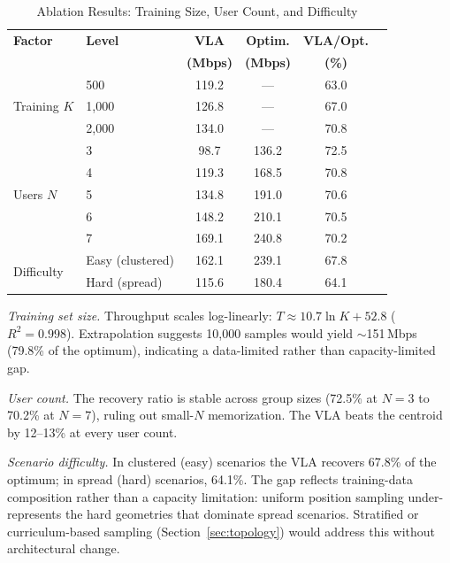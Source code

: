 \documentclass[journal]{IEEEtran}
\begin{document}
\begin{table}[!t]
    \centering
    \caption{Ablation Results: Training Size, User Count, and Difficulty}
    \label{tab:ablation}
    \footnotesize
    \begin{tabular}{@{}llcccc@{}}
        \toprule
        \textbf{Factor} & \textbf{Level} & \textbf{VLA} & \textbf{Optim.} & \textbf{VLA/Opt.} \\
         & & \textbf{(Mbps)} & \textbf{(Mbps)} & \textbf{(\%)} \\
        \midrule
        \multirow{3}{*}{Training $K$} & 500 & 119.2 & --- & 63.0 \\
         & 1{,}000 & 126.8 & --- & 67.0 \\
         & 2{,}000 & 134.0 & --- & 70.8 \\
        \midrule
        \multirow{5}{*}{Users $N$} & 3 & 98.7 & 136.2 & 72.5 \\
         & 4 & 119.3 & 168.5 & 70.8 \\
         & 5 & 134.8 & 191.0 & 70.6 \\
         & 6 & 148.2 & 210.1 & 70.5 \\
         & 7 & 169.1 & 240.8 & 70.2 \\
        \midrule
        \multirow{2}{*}{Difficulty} & Easy (clustered) & 162.1 & 239.1 & 67.8 \\
         & Hard (spread) & 115.6 & 180.4 & 64.1 \\
        \bottomrule
    \end{tabular}
\end{table}

\emph{Training set size.} Throughput scales log-linearly: $T \approx 10.7 \ln K + 52.8$ ($R^2{=}0.998$). Extrapolation suggests 10{,}000 samples would yield ${\sim}$151\,Mbps (79.8\% of the optimum), indicating a data-limited rather than capacity-limited gap.

\emph{User count.} The recovery ratio is stable across group sizes (72.5\% at $N{=}3$ to 70.2\% at $N{=}7$), ruling out small-$N$ memorization. The VLA beats the centroid by 12--13\% at every user count.

\emph{Scenario difficulty.} In clustered (easy) scenarios the VLA recovers 67.8\% of the optimum; in spread (hard) scenarios, 64.1\%. The gap reflects training-data composition rather than a capacity limitation: uniform position sampling under-represents the hard geometries that dominate spread scenarios. Stratified or curriculum-based sampling (Section~\ref{sec:topology}) would address this without architectural change.
\end{document}
